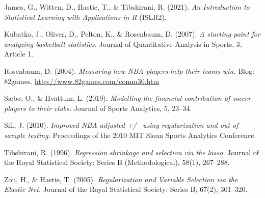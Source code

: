 \documentclass[
]{article}
\begin{document}
James, G., Witten, D., Hastie, T., \& Tibshirani, R. (2021). \emph{An
Introduction to Statistical Learning with Applications in R} (ISLR2).

Kubatko, J., Oliver, D., Pelton, K., \& Rosenbaum, D. (2007). \emph{A
starting point for analyzing basketball statistics.} Journal of
Quantitative Analysis in Sports, 3, Article 1.

Rosenbaum, D. (2004). \emph{Measuring how NBA players help their teams
win.} Blog: 82games. \url{http://www.82games.com/comm30.htm}

Sæbø, O., \& Hvattum, L. (2019). \emph{Modelling the financial
contribution of soccer players to their clubs.} Journal of Sports
Analytics, 5, 23--34.

Sill, J. (2010). \emph{Improved NBA adjusted +/-- using regularization
and out-of-sample testing.} Proceedings of the 2010 MIT Sloan Sports
Analytics Conference.

Tibshirani, R. (1996). \emph{Regression shrinkage and selection via the
lasso.} Journal of the Royal Statistical Society: Series B
(Methodological), 58(1), 267--288.

Zou, H., \& Hastie, T. (2005). \emph{Regularization and Variable
Selection via the Elastic Net.} Journal of the Royal Statistical
Society: Series B, 67(2), 301--320.
\end{document}
